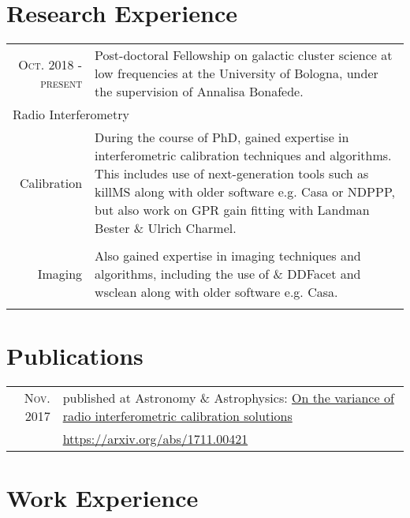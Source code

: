 \documentclass[10pt]{article} %
\begin{document}
\section{Research Experience}

\begin{tabular}{r|p{11cm}} 
\textsc{Oct. 2018 - present} & Post-doctoral Fellowship on galactic cluster science at low frequencies at the University of Bologna, under the supervision of Annalisa Bonafede.\\
\multicolumn{2}{l}{Radio Interferometry }\\
Calibration &  During the course of PhD, gained expertise in interferometric calibration techniques and algorithms. This includes use of next-generation tools such as killMS along with older software e.g. Casa or NDPPP, but also work on GPR gain fitting with Landman Bester \& Ulrich Charmel.\\
\multicolumn{2}{c}{} \\
Imaging     &  Also gained expertise in imaging techniques and algorithms, including the use of \& DDFacet and wsclean along with older software e.g. Casa.\\
\multicolumn{2}{c}{} \\
\end{tabular}


\section{Publications}

\begin{tabular}{r|p{13.5cm}}
\textsc{Nov.} 2017 & published at Astronomy \& Astrophysics: \hyperlink{https://arxiv.org/abs/1711.00421}{On the variance of radio interferometric calibration solutions}\\
                   & \url{https://arxiv.org/abs/1711.00421}
\end{tabular}


\section{Work Experience}
\end{document}
